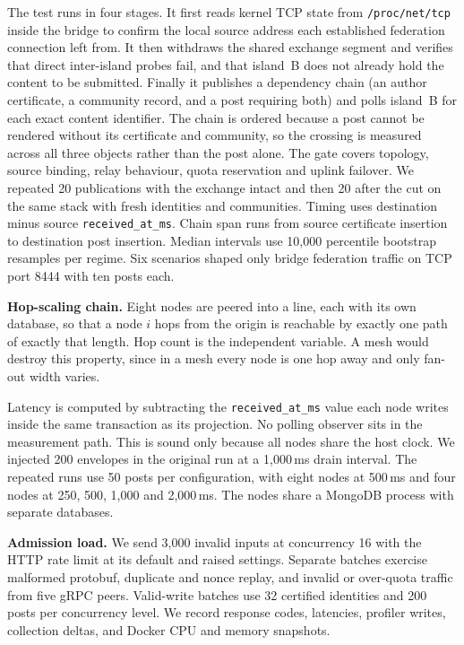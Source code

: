 \documentclass[conference,a4paper,10pt]{IEEEtran}
\begin{document}
The test runs in four stages. It first reads kernel TCP state from \texttt{/proc/net/tcp} inside the bridge to confirm the local source address each established federation connection left from. It then withdraws the shared exchange segment and verifies that direct inter-island probes fail, and that island~B does not already hold the content to be submitted. Finally it publishes a dependency chain (an author certificate, a community record, and a post requiring both) and polls island~B for each exact content identifier. The chain is ordered because a post cannot be rendered without its certificate and community, so the crossing is measured across all three objects rather than the post alone. The gate covers topology, source binding, relay behaviour, quota reservation and uplink failover. We repeated 20 publications with the exchange intact and then 20 after the cut on the same stack with fresh identities and communities. Timing uses destination minus source \texttt{received\_at\_ms}. Chain span runs from source certificate insertion to destination post insertion. Median intervals use 10,000 percentile bootstrap resamples per regime. Six scenarios shaped only bridge federation traffic on TCP port 8444 with ten posts each.

\textbf{Hop-scaling chain.} Eight nodes are peered into a line, each with its
own database, so that a node $i$ hops from the origin is reachable by exactly
one path of exactly that length. Hop count is the independent variable. A mesh
would destroy this property, since in a mesh every node is one hop away and
only fan-out width varies.

Latency is computed by subtracting the \texttt{received\_at\_ms} value each
node writes inside the same transaction as its projection. No polling observer
sits in the measurement path. This is sound only because all nodes share the host clock. We injected 200 envelopes in the original run at a 1{,}000\,ms drain interval. The repeated runs use 50 posts per configuration, with eight nodes at 500\,ms and four nodes at 250, 500, 1{,}000 and 2{,}000\,ms. The nodes share a MongoDB process with separate databases.

\textbf{Admission load.} We send 3,000 invalid inputs at concurrency 16 with the HTTP rate limit at its default and raised settings. Separate batches exercise malformed protobuf, duplicate and nonce replay, and invalid or over-quota traffic from five gRPC peers. Valid-write batches use 32 certified identities and 200 posts per concurrency level. We record response codes, latencies, profiler writes, collection deltas, and Docker CPU and memory snapshots.
\end{document}
